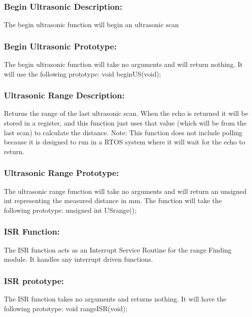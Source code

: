\documentclass[]{article}
\begin{document}
\subsubsection{Begin Ultrasonic Description:}
The begin ultrasonic function will begin an ultrasonic scan

\subsubsection{Begin Ultrasonic Prototype:}
The begin ultrasonic function will take no arguments and will return nothing. It will use the following prototype: \newline \newline
void beginUS(void);

\subsubsection{Ultrasonic Range Description:}
Returns the range of the last ultrasonic scan. When the echo is returned it will be stored in a register, and this function just uses that value (which will be from the last scan) to calculate the distance. Note: This function does not include polling because it is designed to run in a RTOS system where it will wait for the echo to return.

\subsubsection{Ultrasonic Range Prototype:}
The ultrasonic range function will take no arguments and will return an unsigned int representing the measured distance in mm. The function will take the following prototype: \newline \newline
unsigned int USrange();

\subsubsection{ISR Function:}
The ISR function acts as an Interrupt Service Routine for the range Finding module. It handles any interrupt driven functions.

\subsubsection{ISR prototype:}
The ISR function takes no arguments and returns nothing. It will have the following prototype: \newline \newline
void rangeISR(void);
\end{document}
